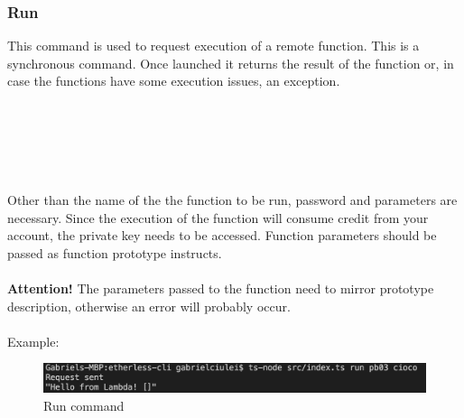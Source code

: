 \subsubsection{Run}
This command is used to request execution of a remote function. This is a synchronous command. Once launched it returns the result of the function or, in case the functions have some execution issues, an exception.\\\\
\centerline{}\\\\
\\\\Other than the name of the the function to be run, password and parameters are necessary. Since the execution of the function will consume credit from your account, the private key needs to be accessed. Function parameters should be passed as function prototype instructs.\\\\
\textbf{Attention!} The parameters passed to the function need to mirror prototype description, otherwise an error will probably occur.\\\\
Example:
\begin{figure}
	\centering
	\includegraphics[width=\textwidth]{res/img/Screenshot_run.png}
	\caption{Run command}
\end{figure}
